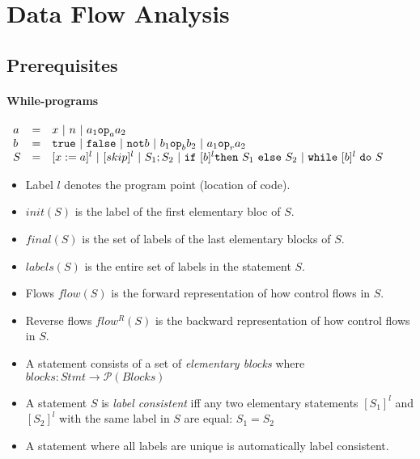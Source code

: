 \chapter{Data Flow Analysis}
\label{chap:data-flow-analysis}

\section{Prerequisites}

\subsubsection{While-programs}

\begin{math}
  \begin{array}{lll}
    a & = & x \text{ }|\text{ } n \text{ }|\text{ } a_1 \mathtt{op}_a a_2 \\
    b & = & \mathtt{true} \text{ }|\text{ } \mathtt{false} \text{ }|\text{ } \mathtt{not} b \text{ }|\text{ } b_1 \mathtt{op}_b b_2 \text{ }|\text{ } a_1 \mathtt{op}_r a_2 \\
    S & = & [x := a]^l \text{ }|\text{ } [skip]^l \text{ }|\text{ } S_1; S_2 \text{ }|\text{ } \mathtt{if} \text{ } [b]^l \mathtt{then} \text{ } S_1 \text{ } \mathtt{else} \text{ } S_2 \text{ }|\text{ } \mathtt{while}\text{ } [b]^l \text{ } \mathtt{do} \text{ } S
  \end{array}
\end{math}


\begin{itemize}
\item Label $l$ denotes the program point (location of code).
\item $init(S)$ is the label of the first elementary bloc of $S$.
\item $final(S)$ is the set of labels of the last elementary blocks of
  $S$.
\item $labels(S)$ is the entire set of labels in the statement $S$.
\item Flows $flow(S)$ is the forward representation of how control
  flows in $S$.
\item Reverse flows $flow^R(S)$ is the backward representation of how
  control flows in $S$.
\item A statement consists of a set of \textit{elementary blocks}
  where $blocks : Stmt \to \mathcal{P}(Blocks)$
\item A statement $S$ is \textit{label consistent} iff any two
  elementary statements $[S_1]^l$ and $[S_2]^l$ with the same label in
  $S$ are equal: $S_1 = S_2$
\item A statement where all labels are unique is automatically label
  consistent.

\end{itemize}


